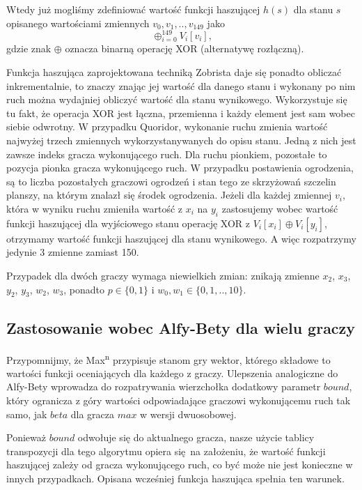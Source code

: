 \documentclass{pracamgr}
\begin{document}
Wtedy już mogliśmy zdefiniować wartość funkcji haszującej \(h(s)\) dla stanu \(s\) opisanego wartościami zmiennych \(v_0, v_1, .., v_{149}\) jako \[\oplus_{i = 0}^{149} V_i[v_i]\text{,}\] gdzie znak \(\oplus\) oznacza binarną operację XOR (alternatywę rozłączną).

Funkcja haszująca zaprojektowana techniką Zobrista daje się ponadto obliczać inkrementalnie, to znaczy znając jej wartość dla danego stanu i wykonany po nim ruch można wydajniej obliczyć wartość dla stanu wynikowego.
Wykorzystuje się tu fakt, że operacja XOR jest łączna, przemienna i każdy element jest sam wobec siebie odwrotny.
W przypadku Quoridor, wykonanie ruchu zmienia wartość najwyżej trzech zmiennych wykorzystanywanych do opisu stanu.
Jedną z nich jest zawsze indeks gracza wykonującego ruch.
Dla ruchu pionkiem, pozostałe to pozycja pionka gracza wykonującego ruch.
W przypadku postawienia ogrodzenia, są to liczba pozostałych graczowi ogrodzeń i stan tego ze skrzyżowań szczelin planszy, na którym znalazł się środek ogrodzenia.
Jeżeli dla każdej zmiennej \(v_i\), która w wyniku ruchu zmieniła wartość z \(x_i\) na \(y_i\) zastosujemy wobec wartość funkcji haszującej dla wyjściowego stanu operację XOR z \(V_i[x_i] \oplus V_i[y_i]\), otrzymamy wartość funkcji haszującej dla stanu wynikowego.
A więc rozpatrzymy jedynie 3 zmienne zamiast 150.

Przypadek dla dwóch graczy wymaga niewielkich zmian: znikają zmienne \(x_2\), \(x_3\), \(y_2\), \(y_3\), \(w_2\), \(w_3\), ponadto \(p \in \{0, 1\}\) i \(w_0, w_1 \in \{0, 1, .., 10\}\).

\subsection{Zastosowanie wobec Alfy-Bety dla wielu graczy}

Przypomnijmy, że Max\textsuperscript{n} przypisuje stanom gry wektor, którego składowe to wartości funkcji oceniających dla każdego z graczy.
Ulepszenia analogiczne do Alfy-Bety wprowadza do rozpatrywania wierzchołka dodatkowy parametr \(bound\), który ogranicza z góry wartości odpowiadające graczowi wykonującemu ruch tak samo, jak \(beta\) dla gracza \(max\) w wersji dwuosobowej.

Ponieważ \(bound\) odwołuje się do aktualnego gracza, nasze użycie tablicy transpozycji dla tego algorytmu opiera się na założeniu, że wartość funkcji haszującej zależy od gracza wykonującego ruch, co być może nie jest konieczne w innych przypadkach.
Opisana wcześniej funkcja haszująca spełnia ten warunek.
\end{document}
